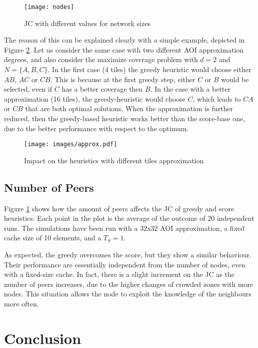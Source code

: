 \documentclass[final,10pt,a5paper]{phdimt}
\theoremstyle{definition}
\begin{document}
\begin{figure}[tbh]
\centering
\texttt{[image: nodes]}
\caption{JC with different values for network sizes}
\label{graph:scal}
\end{figure}


The reason of this can be explained clearly with a simple example, depicted in Figure \ref{fig:approx}.
Let us consider the same case with two different AOI approximation degrees, and also consider the maximize coverage problem with
$d = 2$ and $N = \{A,B,C\}$. In the first case (4 tiles) the greedy heuristic would choose either $AB$, $AC$ or $CB$. This is because at the first greedy step, either $C$ or $B$ would be selected, even if $C$ has a better coverage then $B$.
In the case with a better approximation (16 tiles), the greedy-heuristic would choose $C$, which leads to $CA$ or $CB$ that are both optimal solutions. When the approximation is further reduced, then the greedy-based heuristic works better than the score-base one, due to the better performance with respect to the optimum.


\begin{figure}[tbh]
\centering
\texttt{[image: images/approx.pdf]}
\caption{Impact on the heuristics with different tiles approximation}\label{fig:approx}
\end{figure}



\subsection{Number of Peers}

Figure \ref{graph:scal} shows how the amount of peers affects the JC of greedy and score heuristics.
Each point in the plot is the average of the outcome of 20 independent runs. The simulations have been run with a 32x32 AOI approximation, a fixed cache size of 10 elements, and a $T_S = 1$.

As expected, the greedy overcomes the score, but they show a similar behaviour. 
Their performance are essentially independent from the number of nodes, even with a fixed-size cache.
In fact, there is a slight increment on the JC as the number of peers increases, due to the higher changes of crowded zones with more nodes.
This situation allows the node to exploit the knowledge of the neighbours more often.




\section{Conclusion}
\end{document}
